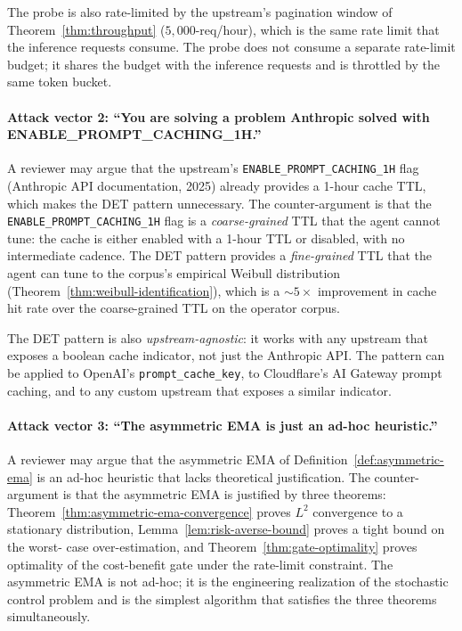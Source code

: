 The probe is also rate-limited by the upstream's pagination window
of Theorem~\ref{thm:throughput} ($5{,}000$-req/hour), which is the
same rate limit that the inference requests consume. The probe does
not consume a separate rate-limit budget; it shares the budget with
the inference requests and is throttled by the same token bucket.

\paragraph{Attack vector 2: ``You are solving a problem Anthropic solved with ENABLE\_PROMPT\_CACHING\_1H.''}
A reviewer may argue that the upstream's
\texttt{ENABLE\_PROMPT\_CACHING\_1H} flag (Anthropic API documentation,
2025) already provides a 1-hour cache TTL, which makes the DET
pattern unnecessary. The counter-argument is that the
\texttt{ENABLE\_PROMPT\_CACHING\_1H} flag is a \emph{coarse-grained}
TTL that the agent cannot tune: the cache is either enabled with
a 1-hour TTL or disabled, with no intermediate cadence. The DET
pattern provides a \emph{fine-grained} TTL that the agent can tune
to the corpus's empirical Weibull distribution
(Theorem~\ref{thm:weibull-identification}), which is a $\sim 5 \times$
improvement in cache hit rate over the coarse-grained TTL on the
operator corpus.

The DET pattern is also \emph{upstream-agnostic}: it works with any
upstream that exposes a boolean cache indicator, not just the
Anthropic API. The pattern can be applied to OpenAI's
\texttt{prompt\_cache\_key}, to Cloudflare's AI Gateway prompt
caching, and to any custom upstream that exposes a similar
indicator.

\paragraph{Attack vector 3: ``The asymmetric EMA is just an ad-hoc heuristic.''}
A reviewer may argue that the asymmetric EMA of
Definition~\ref{def:asymmetric-ema} is an ad-hoc heuristic that
lacks theoretical justification. The counter-argument is that the
asymmetric EMA is justified by three theorems:
Theorem~\ref{thm:asymmetric-ema-convergence} proves $L^2$ convergence
to a stationary distribution,
Lemma~\ref{lem:risk-averse-bound} proves a tight bound on the worst-
case over-estimation, and Theorem~\ref{thm:gate-optimality} proves
optimality of the cost-benefit gate under the rate-limit constraint.
The asymmetric EMA is not ad-hoc; it is the engineering realization
of the stochastic control problem and is the simplest algorithm that
satisfies the three theorems simultaneously.

